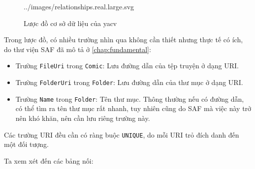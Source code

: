 \documentclass[../../../../thesis]{subfiles}
\begin{document}
\begin{wrapfigure}[26]{r}{10cm}
    \vspace*{-10mm}
    
        {../images/relationships.real.large.svg}
    \vspace*{-10mm}
    \caption{Lược đồ cơ sở dữ liệu của yacv}
    \label{fig:db-schema}
\end{wrapfigure}

Trong lược đồ, có nhiều trường nhìn qua không cần thiết nhưng thực tế có ích, do
thư viện SAF đã mô tả ở \autoref{chap:fundamental}:

\begin{itemize}
    \item
          Trường \texttt{FileUri} trong \texttt{Comic}: Lưu đường dẫn của tệp
          truyện ở dạng URI.
    \item
          Trường \texttt{FolderUri} trong \texttt{Folder}: Lưu đường dẫn của thư
          mục ở dạng URI.
    \item
          Trường \texttt{Name} trong \texttt{Folder}: Tên thư mục. Thông thường
          nếu có đường dẫn, có thể tìm ra tên thư mục rất nhanh, tuy nhiên cũng
          do SAF mà việc này trở nên khó khăn, nên cần lưu riêng trường này.
\end{itemize}

Các trường URI đều cần có ràng buộc \texttt{UNIQUE}, do mỗi URI trỏ đích danh
đến một đối tượng.

Ta xem xét đến các bảng nối:
\end{document}
